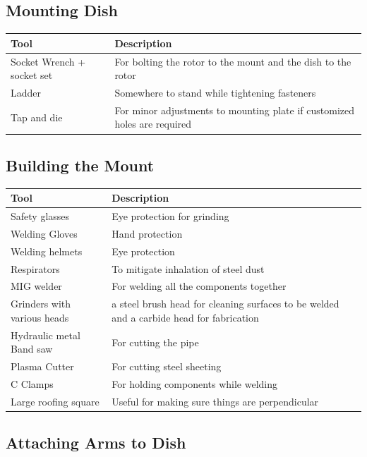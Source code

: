 \documentclass[11pt]{article} %
\begin{document}
\subsection{Mounting Dish}

\begin{tabular}{| l | p{10cm} |}
\hline
\textbf{Tool} & \textbf{Description} \\ \hline \hline
Socket Wrench + socket set & For bolting the rotor to the mount and the dish to the rotor \\ \hline
Ladder & Somewhere to stand while tightening fasteners \\ \hline
Tap and die & For minor adjustments to mounting plate if customized holes are required \\ \hline
\end{tabular}


\subsection{Building the Mount}

\begin{tabular}{| l | p{10cm} |}
\hline
\textbf{Tool} & \textbf{Description} \\ \hline \hline
Safety glasses & Eye protection for grinding \\ \hline
Welding Gloves & Hand protection \\ \hline
Welding helmets & Eye protection \\ \hline
Respirators & To mitigate inhalation of steel dust \\ \hline
MIG welder & For welding all the components together \\ \hline
Grinders with various heads & a steel brush head for cleaning surfaces to be welded and a carbide head for fabrication \\ \hline
Hydraulic metal Band saw & For cutting the pipe \\ \hline
Plasma Cutter & For cutting steel sheeting \\ \hline
C Clamps & For holding components while welding \\ \hline
Large roofing square & Useful for making sure things are perpendicular \\ \hline
\end{tabular}


\subsection{Attaching Arms to Dish}
\end{document}
